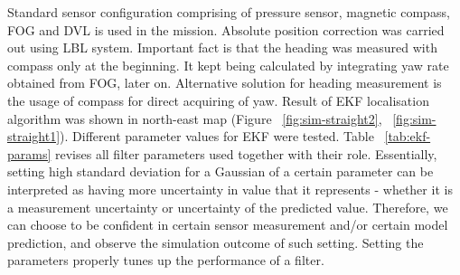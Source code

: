 Standard sensor configuration comprising of pressure sensor, magnetic compass, FOG and DVL is used in the mission. Absolute position correction was carried out using LBL system. Important fact is that the heading was measured with compass only at the beginning. It kept being calculated by integrating yaw rate obtained from FOG, later on. Alternative solution for heading measurement is the usage of compass for direct acquiring of yaw. Result of EKF localisation algorithm was shown in north-east map (Figure ~\ref{fig:sim-straight2}, ~\ref{fig:sim-straight1}). Different parameter values for EKF were tested. Table ~\ref{tab:ekf-params} revises all filter parameters used together with their role. Essentially, setting high standard deviation for a Gaussian of a certain parameter can be interpreted as having more uncertainty in value that it represents - whether it is a measurement uncertainty or uncertainty of the predicted value. Therefore, we can choose to be confident in certain sensor measurement and/or certain model prediction, and observe the simulation outcome of such setting. Setting the parameters properly tunes up the performance of a filter.    
